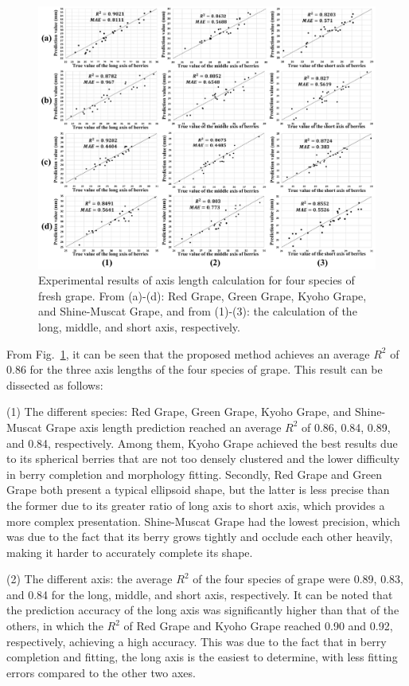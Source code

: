 \documentclass[12pt]{article}
\begin{document}
\begin{figure}[hbt!]
    \centering
    \includegraphics[width=1\textwidth]{figures/Figure14.pdf}
    \caption{Experimental results of axis length calculation for four species of fresh grape. From (a)-(d): Red Grape, Green Grape, Kyoho Grape, and Shine-Muscat Grape, and from (1)-(3): the calculation of the long, middle, and short axis, respectively.}
    \label{fig:raw17}
\end{figure}

From Fig.~\ref{fig:raw17}, it can be seen that the proposed method achieves an average $R^2$ of 0.86 for the three axis lengths of the four species of grape. 
This result can be dissected as follows:

(1) The different species: Red Grape, Green Grape, Kyoho Grape, and Shine-Muscat Grape axis length prediction reached an average $R^2$ of 0.86, 0.84, 0.89, and 0.84, respectively. 
Among them, Kyoho Grape achieved the best results due to its spherical berries that are not too densely clustered and the lower difficulty in berry completion and morphology fitting. 
Secondly, Red Grape and Green Grape both present a typical ellipsoid shape, but the latter is less precise than the former due to its greater ratio of long axis to short axis, which provides a more complex presentation. 
Shine-Muscat Grape had the lowest precision, which was due to the fact that its berry grows tightly and occlude each other heavily, making it harder to accurately complete its shape.

(2) The different axis: the average $R^2$ of the four species of grape were 0.89, 0.83, and 0.84 for the long, middle, and short axis, respectively. 
It can be noted that the prediction accuracy of the long axis was significantly higher than that of the others, in which the $R^2$ of Red Grape and Kyoho Grape reached 0.90 and 0.92, respectively, achieving a high accuracy. 
This was due to the fact that in berry completion and fitting, the long axis is the easiest to determine, with less fitting errors compared to the other two axes.
\end{document}
